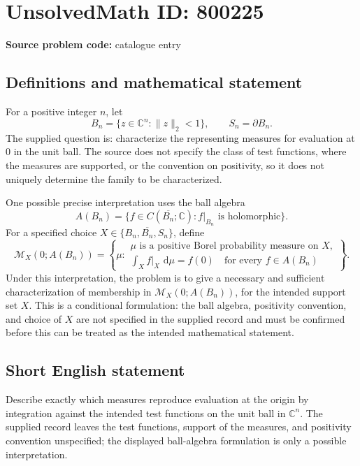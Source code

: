 \documentclass[11pt]{article}
\newcommand{\C}{\mathbb{C}}
\newcommand{\dd}{\,\mathrm{d}}
\begin{document}
\section*{UnsolvedMath ID: 800225}
\textbf{Source problem code:} catalogue entry
\subsection{Definitions and mathematical statement}
For a positive integer \(n\), let
\[
B_n=\{z\in\C^n:\|z\|_2<1\},\qquad S_n=\partial B_n.
\]
The supplied question is: characterize the representing measures for evaluation at \(0\) in the unit ball. The source does not specify the class of test functions, where the measures are supported, or the convention on positivity, so it does not uniquely determine the family to be characterized.

One possible precise interpretation uses the ball algebra
\[
A(B_n)=\{f\in C(\overline{B_n};\C):f|_{B_n}\text{ is holomorphic}\}.
\]
For a specified choice \(X\in\{B_n,\overline{B_n},S_n\}\), define
\[
\mathcal M_X(0;A(B_n))=
\left\{\mu:\begin{array}{l}
\mu\text{ is a positive Borel probability measure on }X,\\[2pt]
\displaystyle\int_X f|_X\,\dd\mu=f(0)\quad\text{for every }f\in A(B_n)
\end{array}\right\}.
\]
Under this interpretation, the problem is to give a necessary and sufficient characterization of membership in \(\mathcal M_X(0;A(B_n))\), for the intended support set \(X\). This is a conditional formulation: the ball algebra, positivity convention, and choice of \(X\) are not specified in the supplied record and must be confirmed before this can be treated as the intended mathematical statement.
\subsection{Short English statement}
Describe exactly which measures reproduce evaluation at the origin by integration against the intended test functions on the unit ball in \(\C^n\). The supplied record leaves the test functions, support of the measures, and positivity convention unspecified; the displayed ball-algebra formulation is only a possible interpretation.
\end{document}
